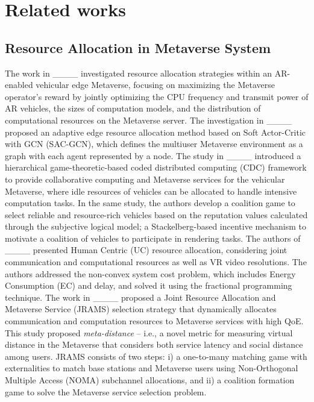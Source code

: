 \section{Related works}
\subsection{Resource Allocation in Metaverse System}
The work in ____ investigated resource allocation strategies within an AR-enabled vehicular edge Metaverse, focusing on maximizing the Metaverse operator's reward by jointly optimizing the CPU frequency and transmit power of AR vehicles, the sizes of computation models, and the distribution of computational resources on the Metaverse server.
  The investigation in ____ proposed an adaptive edge resource allocation method based on Soft Actor-Critic with GCN (SAC-GCN), which defines the multiuser Metaverse environment as a graph with each agent represented by a node. The study in ____ introduced a hierarchical game-theoretic-based coded distributed computing (CDC) framework to provide collaborative computing and Metaverse services for the vehicular Metaverse, where idle resources of vehicles can be allocated to handle intensive computation tasks. In the same study, the authors develop a coalition game to select reliable and resource-rich vehicles based on the reputation values calculated through the subjective logical model; a Stackelberg-based incentive mechanism to motivate a coalition of vehicles to participate in rendering tasks. 
  The authors of ____ presented Human Centric (UC) resource allocation, considering joint communication and computational resources as well as VR video resolutions. The authors addressed the non-convex system cost problem, which includes Energy Consumption (EC) and delay, and solved it using the fractional programming technique. The work in ____ proposed a Joint Resource Allocation and Metaverse Service (JRAMS) selection strategy that dynamically allocates communication and computation resources to Metaverse services with high QoE. This study proposed \textit{meta-distance} -- i.e., a novel metric for measuring virtual distance in the Metaverse that considers both service latency and social distance among users. JRAMS consists of two steps: i) a one-to-many matching game with externalities to match base stations and Metaverse users using Non-Orthogonal Multiple Access (NOMA) subchannel allocations, and ii) a coalition formation game to solve the Metaverse service selection problem. 
